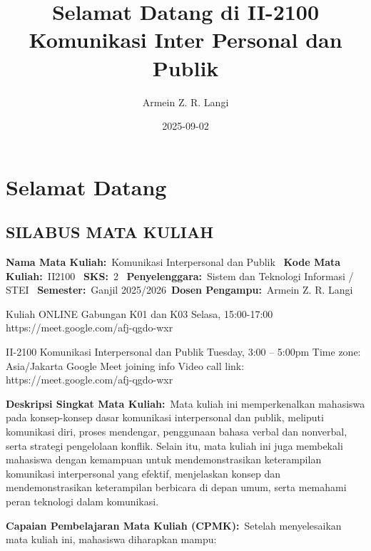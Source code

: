 \documentclass[
  letterpaper,
  DIV=11,
  numbers=noendperiod]{scrreprt}
\title{Selamat Datang di II-2100 Komunikasi Inter Personal dan Publik}
\author{Armein Z. R. Langi}
\date{2025-09-02}
\renewcommand*\contentsname{Table of contents}
\newcommand\contentsname{Table of contents}
\begin{document}
\maketitle

\renewcommand*\contentsname{Table of contents}
{
\hypersetup{linkcolor=}
\setcounter{tocdepth}{2}
\tableofcontents
}


\chapter*{Selamat Datang}\label{selamat-datang}


\section*{\texorpdfstring{\textbf{SILABUS MATA
KULIAH}}{SILABUS MATA KULIAH}}\label{silabus-mata-kuliah}


\textbf{Nama Mata Kuliah:}~Komunikasi Interpersonal dan Publik~
\textbf{Kode Mata Kuliah:}~II2100~ \textbf{SKS:}~2~
\textbf{Penyelenggara:}~Sistem dan Teknologi Informasi / STEI~
\textbf{Semester:}~Ganjil 2025/2026~\textbf{Dosen Pengampu:}~Armein Z.
R. Langi

Kuliah ONLINE Gabungan K01 dan K03 Selasa, 15:00-17:00
https://meet.google.com/afj-qgdo-wxr

II-2100 Komunikasi Interpersonal dan Publik Tuesday, 3:00 -- 5:00pm Time
zone: Asia/Jakarta Google Meet joining info Video call link:
https://meet.google.com/afj-qgdo-wxr

\textbf{Deskripsi Singkat Mata Kuliah:}~Mata kuliah ini memperkenalkan
mahasiswa pada konsep-konsep dasar komunikasi interpersonal dan publik,
meliputi komunikasi diri, proses mendengar, penggunaan bahasa verbal dan
nonverbal, serta strategi pengelolaan konflik. Selain itu, mata kuliah
ini juga membekali mahasiswa dengan kemampuan untuk mendemonstrasikan
keterampilan komunikasi interpersonal yang efektif, menjelaskan konsep
dan mendemonstrasikan keterampilan berbicara di depan umum, serta
memahami peran teknologi dalam komunikasi.

\textbf{Capaian Pembelajaran Mata Kuliah (CPMK):}~Setelah menyelesaikan
mata kuliah ini, mahasiswa diharapkan mampu:
\end{document}
